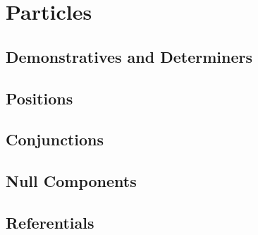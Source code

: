 \chapter{Particles}
	\section{Demonstratives and Determiners}
	\section{Positions}
	\section{Conjunctions}
	\section{Null Components}
	\section{Referentials}
